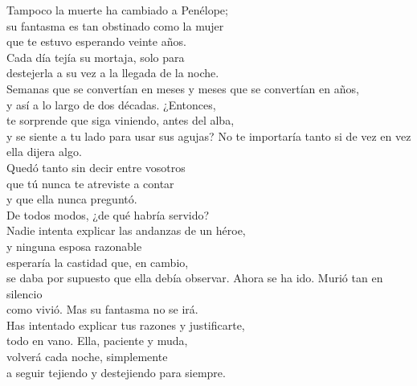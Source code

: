 \begin{versopropio}
Tampoco la muerte ha cambiado a Penélope;\\
su fantasma es tan obstinado como la mujer\\
que te estuvo esperando veinte años.\\
Cada día tejía su mortaja, solo para\\
destejerla a su vez a la llegada de la noche.\\
Semanas que se convertían en meses y meses que se convertían en años,\\
y así a lo largo de dos décadas. ¿Entonces,\\
te sorprende que siga viniendo, antes del alba,\\
y se siente a tu lado para usar sus agujas?
\stanzabreak
No te importaría tanto si de vez en vez\\
ella dijera algo.\\
Quedó tanto sin decir entre vosotros\\
que tú nunca te atreviste a contar\\
y que ella nunca preguntó.\\
De todos modos, ¿de qué habría servido?\\
Nadie intenta explicar las andanzas de un héroe,\\
y ninguna esposa razonable\\
esperaría la castidad que, en cambio,\\
se daba por supuesto que ella debía observar.
\stanzabreak
Ahora se ha ido. Murió tan en silencio\\
como vivió. Mas su fantasma no se irá.\\
Has intentado explicar tus razones y justificarte,\\
todo en vano. Ella, paciente y muda,\\
volverá cada noche, simplemente\\
a seguir tejiendo y destejiendo para siempre.
\end{versopropio}
